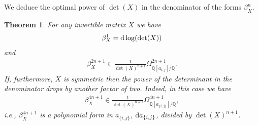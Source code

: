 \documentclass[pdftex]{sigma}%
\newtheorem{thm}{Theorem}[section]
\numberwithin{equation}{section}
\newcommand{\Q}{\mathbb Q}
\newcommand{\0}{\color{blue}{\mathsf{0}}}
\begin{document}
We deduce the optimal power of $\det(X)$ in the denominator of the forms $\beta^{n}_X$.
 \begin{thm} \label{thm: optimaldenom} For
 any invertible matrix $X$ we have
\begin{gather*}
\beta^1_X = {\rm d} \log (\det(X))
\end{gather*}
and
\begin{gather} \label{denomBetaGeneral}
\beta^{2n+1}_X \in \frac{1}{\det(X)^{n+1}} \Omega^{2n+1}_{\Q[ a_{i,j}]/\Q}.
\end{gather}
If, furthermore, $X$ is symmetric then the power of the determinant in the denominator drops by another factor of two. Indeed, in this case we have
\begin{gather} \label{denomBetaSymmetric}
\beta^{4n+1}_X \in \frac{1}{\det(X)^{n+1}} \Omega^{4n+1}_{\Q[ a_{\{i,j\}}]/\Q},
\end{gather}
i.e., $\beta^{4n+1}_X$ is a polynomial form in $a_{\{i,j\}}$, ${\rm d}a_{\{i,j\}}$,
 divided by $\det(X)^{n+1}$.
\end{thm}
\end{document}
